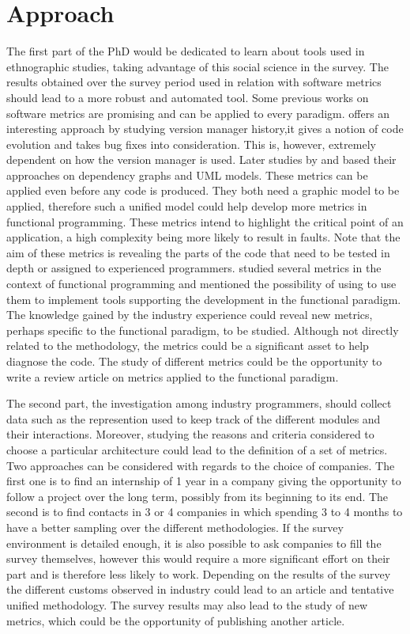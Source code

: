 \documentclass[12p]{article}
\begin{document}
\section*{Approach}
The first part of the PhD would be dedicated to learn about tools used
in ethnographic studies, taking advantage of this social science in
the survey. The results obtained over the survey period used in
relation with software metrics should lead to a more robust and
automated tool. Some previous works on software metrics are promising
and can be applied to every paradigm. \citet{zimmermann_mining_2005}
offers an interesting approach by studying version manager history,it
gives a notion of code evolution and takes bug fixes into
consideration. This is, however, extremely dependent on how the
version manager is used. Later studies by
\citet{zimmermann_predicting_2008} and \citet{soliman_utilizing_2010}
based their approaches on dependency graphs and UML models. These
metrics can be applied even before any code is produced. They both
need a graphic model to be applied, therefore such a unified model
could help develop more metrics in functional programming. These
metrics intend to highlight the critical point of an application, a
high complexity being more likely to result in faults. Note that the
aim of these metrics is revealing the parts of the code that need to
be tested in depth or assigned to experienced
programmers. \citet{ryder_software_2005} studied several metrics in
the context of functional programming and mentioned the possibility of
using to use them to implement tools supporting the development in the
functional paradigm. The knowledge gained by the industry experience
could reveal new metrics, perhaps specific to the functional paradigm,
to be studied. Although not directly related to the methodology, the
metrics could be a significant asset to help diagnose the code. The
study of different metrics could be the opportunity to write a review
article on metrics applied to the functional paradigm.

The second part, the investigation among industry programmers, should
collect data such as the represention used to keep track of the
different modules and their interactions. Moreover, studying the
reasons and criteria considered to choose a particular architecture
could lead to the definition of a set of metrics. Two approaches can
be considered with regards to the choice of companies. The first one
is to find an internship of 1 year in a company giving the opportunity
to follow a project over the long term, possibly from its beginning to
its end. The second is to find contacts in 3 or 4 companies in which
spending 3 to 4 months to have a better sampling over the different
methodologies. If the survey environment is detailed enough, it is
also possible to ask companies to fill the survey themselves, however
this would require a more significant effort on their part and is
therefore less likely to work. Depending on the results of the survey the
different customs observed in industry could lead to an article and
tentative unified methodology. The survey results may also lead to the
study of new metrics, which could be the opportunity of publishing
another article.
\end{document}
